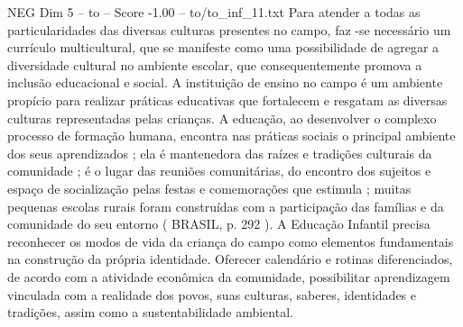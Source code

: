 \begin{textsample}{NEG Dim 5 – to – Score -1.00 – to/to\_inf\_11.txt}
Para atender a todas as particularidades das diversas culturas presentes no campo, faz -se necessário um currículo multicultural, que se manifeste como uma possibilidade de agregar a diversidade cultural no ambiente escolar, que consequentemente promova a inclusão educacional e social.
A instituição de ensino no campo é um ambiente propício para realizar práticas educativas que fortalecem e resgatam as diversas culturas representadas pelas crianças.
A educação, ao desenvolver o complexo processo de formação humana, encontra nas práticas sociais o principal ambiente dos seus aprendizados ; ela é mantenedora das raízes e tradições culturais da comunidade ; é o lugar das reuniões comunitárias, do encontro dos sujeitos e espaço de socialização pelas festas e comemorações que estimula ; muitas pequenas escolas rurais foram construídas com a participação das famílias e da comunidade do seu entorno ( BRASIL, p. 292 ).
A Educação Infantil precisa reconhecer os modos de vida da criança do campo como elementos fundamentais na construção da própria identidade.
Oferecer calendário e rotinas diferenciados, de acordo com a atividade econômica da comunidade, possibilitar aprendizagem vinculada com a realidade dos povos, suas culturas, saberes, identidades e tradições, assim como a sustentabilidade ambiental.

\end{textsample}

